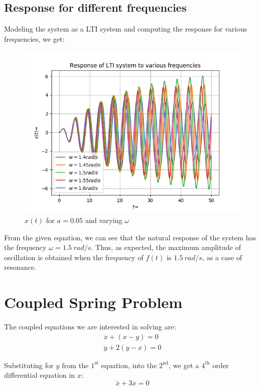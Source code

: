 \documentclass[11pt, a4paper, twoside]{article}
\begin{document}
    \subsection{Response for different frequencies}
        Modeling the system as a LTI system and computing the response for various frequencies, we get:
        \begin{figure}[H]
            \centering
            \includegraphics[scale=0.7]{Fig 3.png}
            \caption{$x(t)$ for $a=0.05$ and varying $\omega$}
            \label{fig:Fig3}
        \end{figure}

        From the given equation, we can see that the natural response of the system has the frequency $\omega= 1.5\ rad/s$.
        Thus, as expected, the maximum amplitude of oscillation is obtained when the frequency of $f(t)$ is $1.5\ rad/s$, as a case of resonance.
\section{Coupled Spring Problem}
    The coupled equations we are interested in solving are:
    \begin{gather*}
        \ddot{x} + (x-y) = 0\\
        \ddot{y} + 2(y-x) = 0
    \end{gather*}

    Substituting for $y$ from the $1^{\text{st}}$ equation, into the $2^{\text{nd}}$, we get a $4^{\text{th}}$ order differential equation in $x$:
    \begin{equation*}
        \ddddot{x} + 3\ddot{x} = 0
    \end{equation*}
\end{document}
